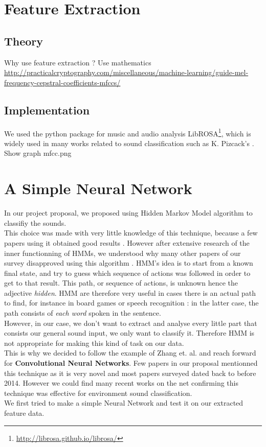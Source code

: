 \documentclass{article} %
\begin{document}
\section{Feature Extraction}

	\subsection{Theory}
		Why use feature extraction ? Use mathematics \url{http://practicalcryptography.com/miscellaneous/machine-learning/guide-mel-frequency-cepstral-coefficients-mfccs/}

	\subsection{Implementation}
		We used the python package for music and audio analysis LibROSA\footnote{\url{http://librosa.github.io/librosa/}}, which is widely used in many works related to sound classification such as K. Pizcack's \cite{cite2}.\\
		\newline
		Show graph mfcc.png
	
\section{A Simple Neural Network}
		In our project proposal, we proposed using Hidden Markov Model algorithm to classifiy the sounds.\\
		This choice was made with very little knowledge of this technique, because a few papers using it obtained good results \cite{cite3} \cite{cite4}. However after extensive research of the inner functionning of HMMs, we understood why many other papers of our survey disapproved using this algorithm \cite{cite5} \cite{cite6}. HMM's idea is to start from a known final state, and try to guess which sequence of actions was followed in order to get to that result. This path, or sequence of actions, is unknown hence the adjective \emph{hidden}. HMM are therefore very useful in cases there is an actual path to find, for instance in board games or speech recognition : in the latter case, the path consists of \emph{each word} spoken in the sentence.\\
		\newline
		However, in our case, we don't want to extract and analyse every little part that consists our general sound input, we only want to classify it. Therefore HMM is not appropriate for making this kind of task on our data.\\
		\newline
		This is why we decided to follow the example of Zhang et. al.\cite{cite6} and reach forward for \textbf{Convolutional Neural Networks}. Few papers in our proposal mentionned this technique as it is very novel and most papers surveyed dated back to before 2014. However we could find many recent works on the net confirming this technique was effective for environment sound classification.\\
		We first tried to make a simple Neural Network and test it on our extracted feature data.\\
\end{document}
